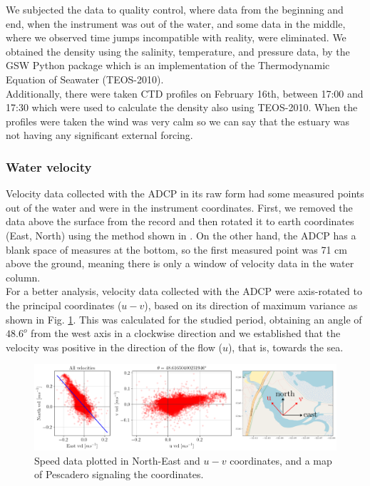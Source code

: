 \documentclass[tesis.tex]{subfiles}
\begin{document}
We subjected the data to quality control, where data from the beginning and end, when the instrument was out of the water, and some data in the middle, where we observed time jumps incompatible with reality, were eliminated. We obtained the density using the salinity, temperature, and pressure data, by the GSW Python package which is an implementation of the Thermodynamic Equation of Seawater (TEOS-2010).\\

Additionally, there were taken CTD profiles on February 16th, between 17:00 and 17:30 which were used to calculate the density also using TEOS-2010. When the profiles were taken the wind was very calm so we can say that the estuary was not having any significant external forcing. \\

\subsubsection{Water velocity} \label{Estuary_currents}

Velocity data collected with the ADCP in its raw form had some measured points out of the water and were in the instrument coordinates. First, we removed the data above the surface from the record and then rotated it to earth coordinates (East, North) using the method shown in \cite{teledyne2008}. On the other hand, the ADCP has a blank space of measures at the bottom, so the first measured point was 71 cm above the ground, meaning there is only a window of velocity data in the water column.\\

For a better analysis, velocity data collected with the ADCP were axis-rotated to the principal coordinates ($u-v$), based on its direction of maximum variance as shown in Fig. \ref{fig:rotacion}. This was calculated for the studied period, obtaining an angle of $48.6^o$ from the west axis in a clockwise direction and we established that the velocity was positive in the direction of the flow ($u$), that is, towards the sea.  

\begin{figure}[h!]
    \centering
    \includegraphics[width=\textwidth]{Imagenes/rotacion.png}
    \caption{Speed data plotted in North-East and $u-v$ coordinates, and a map of Pescadero signaling the coordinates.}
    \label{fig:rotacion}
\end{figure}
\end{document}
